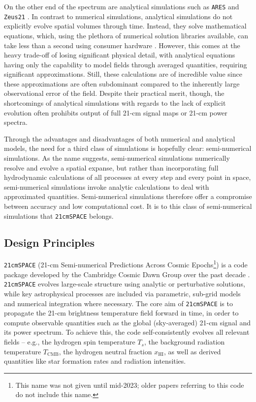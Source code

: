 \documentclass[floats,floatfix,showpacs,amssymb,prd,superscriptaddress,nofootinbib]{revtex4-2} %
\newcommand{\code}{\texttt}
\begin{document}
On the other end of the spectrum are analytical simulations such as \code{ARES} \citep{Mirocha_2014} and \code{Zeus21} \citep{Munoz_2023}. In contrast to numerical simulations, analytical simulations do not explicitly evolve spatial volumes through time. Instead, they solve mathematical equations, which, using the plethora of numerical solution libraries available, can take less than a second using consumer hardware \citep{gessey-jones_thesis}. However, this comes at the heavy trade-off of losing significant physical detail, with analytical equations having only the capability to model fields through averaged quantities, requiring significant approximations. Still, these calculations are of incredible value since these approximations are often subdominant compared to the inherently large observational error of the field. Despite their practical merit, though, the shortcomings of analytical simulations with regards to the lack of explicit evolution often prohibits output of full 21-cm signal maps or 21-cm power spectra.

Through the advantages and disadvantages of both numerical and analytical models, the need for a third class of simulations is hopefully clear: semi-numerical simulations. As the name suggests, semi-numerical simulations numerically resolve and evolve a spatial expanse, but rather than incorporating full hydrodynamic calculations of all processes at every step and every point in space, semi-numerical simulations invoke analytic calculations to deal with approximated quantities. Semi-numerical simulations therefore offer a compromise between accuracy and low computational cost. It is to this class of semi-numerical simulations that \code{21cmSPACE} belongs.


\subsection{Design Principles}
\code{21cmSPACE} (21-cm Semi-numerical Predictions Across Cosmic Epochs\footnote{This name was not given until mid-2023; older papers referring to this code do not include this name.}) is a code package developed by the Cambridge Cosmic Dawn Group over the past decade \citep{Fialkov_2012, Visbal_2012}. \code{21cmSPACE} evolves large-scale structure using analytic or perturbative solutions, while key astrophysical processes are included via parametric, sub-grid models and numerical integration where necessary. The core aim of \code{21cmSPACE} is to propagate the 21-cm brightness temperature field forward in time, in order to compute observable quantities such as the global (sky-averaged) 21-cm signal and its power spectrum. To achieve this, the code self-consistently evolves all relevant fields -- e.g., the hydrogen spin temperature $T_s$, the background radiation temperature $T_{\text{CMB}}$, the hydrogen neutral fraction $x_{\text{HI}}$, as well as derived quantities like star formation rates and radiation intensities.
\end{document}
